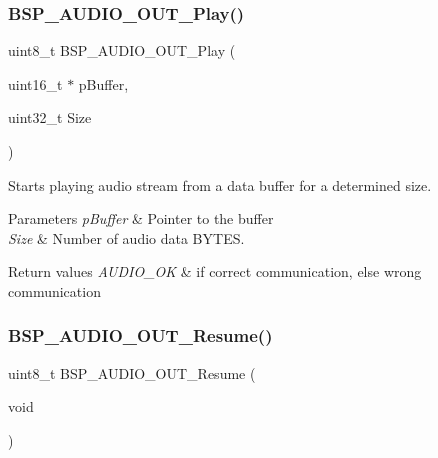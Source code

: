 \subsubsection{\texorpdfstring{B\+S\+P\+\_\+\+A\+U\+D\+I\+O\+\_\+\+O\+U\+T\+\_\+\+Play()}{BSP\_AUDIO\_OUT\_Play()}}
{\footnotesize\ttfamily uint8\+\_\+t B\+S\+P\+\_\+\+A\+U\+D\+I\+O\+\_\+\+O\+U\+T\+\_\+\+Play (\begin{DoxyParamCaption}\item[{uint16\+\_\+t $\ast$}]{p\+Buffer,  }\item[{uint32\+\_\+t}]{Size }\end{DoxyParamCaption})}



Starts playing audio stream from a data buffer for a determined size. 


\begin{DoxyParams}{Parameters}
{\em p\+Buffer} & Pointer to the buffer \\
\hline
{\em Size} & Number of audio data B\+Y\+T\+ES. \\
\hline
\end{DoxyParams}

\begin{DoxyRetVals}{Return values}
{\em A\+U\+D\+I\+O\+\_\+\+OK} & if correct communication, else wrong communication \\
\hline
\end{DoxyRetVals}
\mbox{\label{group___s_t_m32_f4___d_i_s_c_o_v_e_r_y___a_u_d_i_o___o_u_t___private___functions_ga064f0eddd4ab25a33fd1fe83af429c9f}} 
\subsubsection{\texorpdfstring{B\+S\+P\+\_\+\+A\+U\+D\+I\+O\+\_\+\+O\+U\+T\+\_\+\+Resume()}{BSP\_AUDIO\_OUT\_Resume()}}
{\footnotesize\ttfamily uint8\+\_\+t B\+S\+P\+\_\+\+A\+U\+D\+I\+O\+\_\+\+O\+U\+T\+\_\+\+Resume (\begin{DoxyParamCaption}\item[{void}]{ }\end{DoxyParamCaption})}



